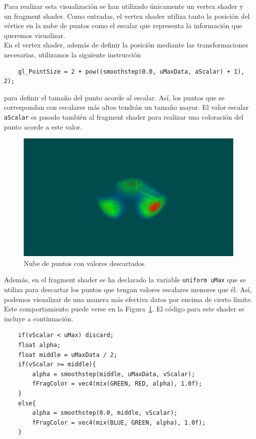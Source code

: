 Para realizar esta visualización se han utilizado únicamente un vertex shader y
un fragment shader. Como entradas, el vertex shader utiliza tanto la posición
del vértice en la nube de puntos como el escalar que representa la información
que queremos visualizar. \\

En el vertex shader, además de definir la posición mediante las transformaciones
necesarias, utilizamos la siguiente instrucción

\begin{verbatim}
    gl_PointSize = 2 + pow((smoothstep(0.0, uMaxData, aScalar) + 1), 2);
\end{verbatim}

para definir el tamaño del punto acorde al escalar. Así, los puntos que se
correspondan con escalares más altos tendrán un tamaño mayor. El valor escalar
\verb|aScalar| es pasado también al fragment shader para realizar una coloración
del punto acorde a este valor. \\

\begin{figure}[hb]
	\centering	
	\includegraphics[width=\textwidth]{figures/mycloud2.png}
	\caption{Nube de puntos con valores descartados}
	\label{fig:mycloud2}
\end{figure}

Además, en el fragment shader se ha declarado la variable \verb|uniform uMax|
que se utiliza para descartar los puntos que tengan valores escalares menores
que él. Así, podemos visualizar de una manera  más efectiva datos por encima de
cierto límite. Este comportamiento puede verse en la Figura~\ref{fig:mycloud2}.
El código para este shader se incluye a continuación.

\begin{verbatim}
    if(vScalar < uMax) discard;	
    float alpha;
    float middle = uMaxData / 2;
    if(vScalar >= middle){
        alpha = smoothstep(middle, uMaxData, vScalar);
        fFragColor = vec4(mix(GREEN, RED, alpha), 1.0f);
    }
    else{
        alpha = smoothstep(0.0, middle, vScalar);
        fFragColor = vec4(mix(BLUE, GREEN, alpha), 1.0f);
    }
\end{verbatim}

